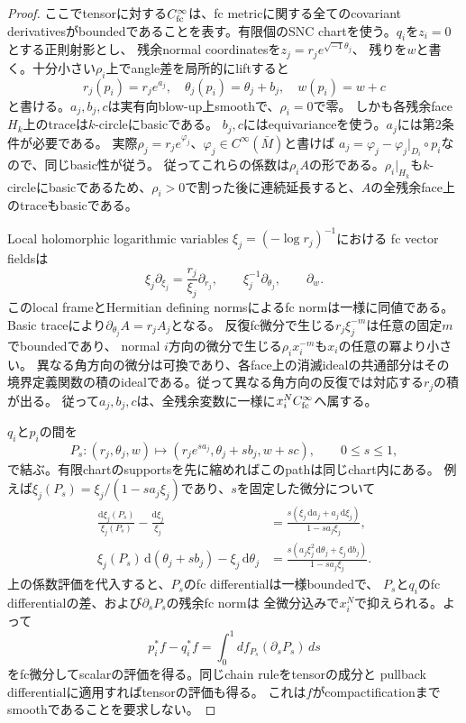 \documentclass[11pt,a4paper]{ltjsarticle}
\newcommand{\dd}{\mathrm d}
\theoremstyle{plain}
\theoremstyle{definition}
\theoremstyle{remark}
\begin{document}
\begin{proof}
ここでtensorに対する$C^\infty_{\rm fc}$は、fc metricに関する全てのcovariant derivativesがboundedであることを表す。有限個のSNC chartを使う。$q_i$を$z_i=0$とする正則射影とし、
残余normal coordinatesを$z_j=r_j e^{\sqrt{-1}\theta_j}$、
残りを$w$と書く。十分小さい$\rho_i$上でangle差を局所的にliftすると
\[
 r_j(p_i)=r_j e^{a_j},\quad
 \theta_j(p_i)=\theta_j+b_j,\quad w(p_i)=w+c
\]
と書ける。$a_j,b_j,c$は実有向blow-up上smoothで、$\rho_i=0$で零。
しかも各残余face $H_k$上のtraceは$k$-circleにbasicである。
$b_j,c$にはequivarianceを使う。$a_j$には第2条件が必要である。
実際$\rho_j=r_j e^{\varphi_j}$、$\varphi_j\in C^\infty(\bar M)$と書けば
$a_j=\varphi_j-\varphi_j|_{D_i}\circ p_i$なので、同じbasic性が従う。
従ってこれらの係数は$\rho_i A$の形である。$\rho_i|_{H_k}$も$k$-circleにbasicであるため、$\rho_i>0$で割った後に連続延長すると、$A$の全残余face上のtraceもbasicである。

Local holomorphic logarithmic variables $\xi_j=(-\log r_j)^{-1}$における
fc vector fieldsは
\[
 \xi_j\partial_{\xi_j}=\frac{r_j}{\xi_j}\partial_{r_j},\qquad
 \xi_j^{-1}\partial_{\theta_j},\qquad \partial_w.
\]
このlocal frameとHermitian defining normsによるfc normは一様に同値である\cite[Lemma~2.4, (2.25)--(2.29)]{RochonZhang}。
Basic traceにより$\partial_{\theta_j}A=r_j A_j$となる。
反復fc微分で生じる$r_j\xi_j^{-m}$は任意の固定$m$でboundedであり、
normal $i$方向の微分で生じる$\rho_i x_i^{-m}$も$x_i$の任意の冪より小さい。
異なる角方向の微分は可換であり、各face上の消滅idealの共通部分はその境界定義関数の積のidealである。従って異なる角方向の反復では対応する$r_j$の積が出る。
従って$a_j,b_j,c$は、全残余変数に一様に$x_i^N C^\infty_{\rm fc}$へ属する。

$q_i$と$p_i$の間を
\[
 P_s:(r_j,\theta_j,w)\longmapsto
 (r_j e^{s a_j},\theta_j+s b_j,w+s c),\qquad 0\le s\le1,
\]
で結ぶ。有限chartのsupportsを先に縮めればこのpathは同じchart内にある。
例えば$\xi_j(P_s)=\xi_j/(1-s a_j\xi_j)$であり、$s$を固定した微分について
\[
 \begin{aligned}
 \frac{\dd\xi_j(P_s)}{\xi_j(P_s)}-\frac{\dd\xi_j}{\xi_j}
 &=\frac{s(\xi_j\,\dd a_j+a_j\,\dd\xi_j)}{1-s a_j\xi_j},\\
 \xi_j(P_s)\,\dd(\theta_j+s b_j)-\xi_j\,\dd\theta_j
 &=\frac{s(a_j\xi_j^2\,\dd\theta_j+\xi_j\,\dd b_j)}{1-s a_j\xi_j}.
 \end{aligned}
\]
上の係数評価を代入すると、$P_s$のfc differentialは一様boundedで、
$P_s$と$q_i$のfc differentialの差、および$\partial_sP_s$の残余fc normは
全微分込みで$x_i^N$で抑えられる。よって
\[
 p_i^*f-q_i^*f=\int_0^1 df_{P_s}(\partial_sP_s)\,ds
\]
をfc微分してscalarの評価を得る。同じchain ruleをtensorの成分と
pullback differentialに適用すればtensorの評価も得る。
これは$f$がcompactificationまでsmoothであることを要求しない。


\end{proof}
\end{document}
